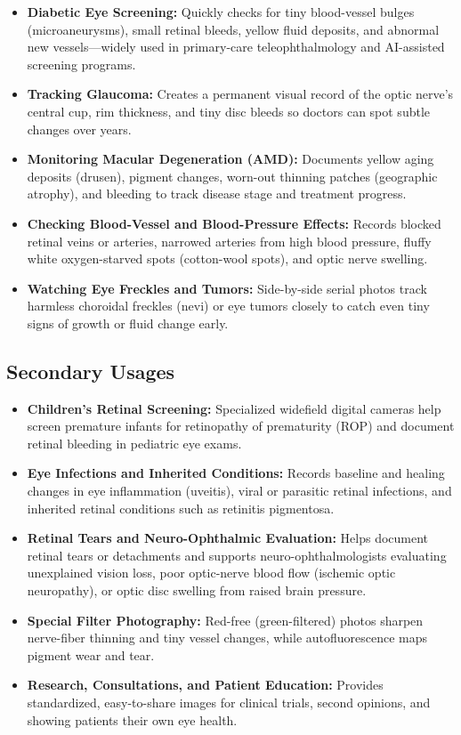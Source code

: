 \begin{itemize}
    \item \textbf{Diabetic Eye Screening:} Quickly checks for tiny blood-vessel bulges (microaneurysms), small retinal bleeds, yellow fluid deposits, and abnormal new vessels---widely used in primary-care teleophthalmology and AI-assisted screening programs.
    \item \textbf{Tracking Glaucoma:} Creates a permanent visual record of the optic nerve's central cup, rim thickness, and tiny disc bleeds so doctors can spot subtle changes over years.
    \item \textbf{Monitoring Macular Degeneration (AMD):} Documents yellow aging deposits (drusen), pigment changes, worn-out thinning patches (geographic atrophy), and bleeding to track disease stage and treatment progress.
    \item \textbf{Checking Blood-Vessel and Blood-Pressure Effects:} Records blocked retinal veins or arteries, narrowed arteries from high blood pressure, fluffy white oxygen-starved spots (cotton-wool spots), and optic nerve swelling.
    \item \textbf{Watching Eye Freckles and Tumors:} Side-by-side serial photos track harmless choroidal freckles (nevi) or eye tumors closely to catch even tiny signs of growth or fluid change early.
\end{itemize}

\subsection{Secondary Usages}

\begin{itemize}
    \item \textbf{Children's Retinal Screening:} Specialized widefield digital cameras help screen premature infants for retinopathy of prematurity (ROP) and document retinal bleeding in pediatric eye exams.
    \item \textbf{Eye Infections and Inherited Conditions:} Records baseline and healing changes in eye inflammation (uveitis), viral or parasitic retinal infections, and inherited retinal conditions such as retinitis pigmentosa.
    \item \textbf{Retinal Tears and Neuro-Ophthalmic Evaluation:} Helps document retinal tears or detachments and supports neuro-ophthalmologists evaluating unexplained vision loss, poor optic-nerve blood flow (ischemic optic neuropathy), or optic disc swelling from raised brain pressure.
    \item \textbf{Special Filter Photography:} Red-free (green-filtered) photos sharpen nerve-fiber thinning and tiny vessel changes, while autofluorescence maps pigment wear and tear.
    \item \textbf{Research, Consultations, and Patient Education:} Provides standardized, easy-to-share images for clinical trials, second opinions, and showing patients their own eye health.
\end{itemize}


